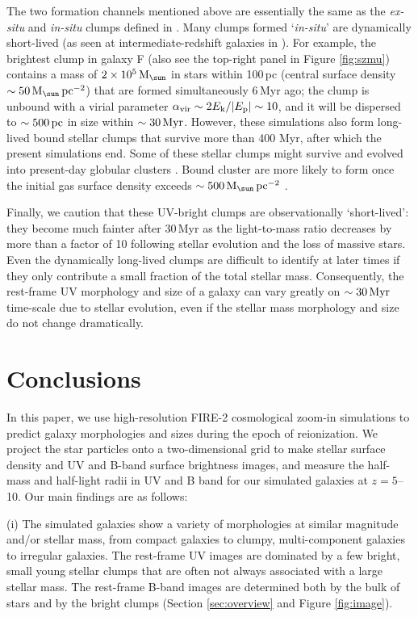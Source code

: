 \documentclass[useAMS,usenatbib]{mn2e}
\newcommand{\pc}{{\rm pc}}
\newcommand{\Myr}{{\rm Myr}}
\newcommand{\Msun}{{\rm M}_{\sun}}
\begin{document}
The two formation channels mentioned above are essentially the same as the {\em ex-situ} and {\em in-situ} clumps defined in \citet{mandelker.2017:giant.clumps}. Many clumps formed `{\em in-situ}' are dynamically short-lived (as seen at intermediate-redshift galaxies in \citealt{oklopcic.2017:fire.giant.clump}). For example, the brightest clump in galaxy F (also see the top-right panel in Figure \ref{fig:szmu}) contains a mass of $2\times10^5\,\Msun$ in stars within 100\,pc (central surface density $\sim50\,\Msun\,\pc^{-2}$) that are formed simultaneously 6\,Myr ago; the clump is unbound with a virial parameter $\alpha_{\rm vir}\sim2E_{\rm k}/|E_{\rm p}|\sim10$, and it will be dispersed to $\sim500\,\pc$ in size within $\sim30\,\Myr$. However, these simulations also form long-lived bound stellar clumps that survive more than 400 Myr, after which the present simulations end. Some of these stellar clumps might survive and evolved into present-day globular clusters \citep{kim.2018:globular.candidate.fire}. Bound cluster are more likely to form once the initial gas surface density exceeds $\sim500\,\Msun\,\pc^{-2}$ \citep[also see][]{grudic.2017:high.sf.efficiency}. 

Finally, we caution that these UV-bright clumps are observationally `short-lived': they become much fainter after 30\,Myr as the light-to-mass ratio decreases by more than a factor of 10 following stellar evolution and the loss of massive stars. Even the dynamically long-lived clumps are difficult to identify at later times if they only contribute a small fraction of the total stellar mass. Consequently, the rest-frame UV morphology and size of a galaxy can vary greatly on $\sim30\,\Myr$ time-scale due to stellar evolution, even if the stellar mass morphology and size do not change dramatically.


\section{Conclusions}
\label{sec:conclusion}
In this paper, we use high-resolution FIRE-2 cosmological zoom-in simulations to predict galaxy morphologies and sizes during the epoch of reionization. We project the star particles onto a two-dimensional grid to make stellar surface density and UV and B-band surface brightness images, and measure the half-mass and half-light radii in UV and B band for our simulated galaxies at $z=5$--10. Our main findings are as follows: 

(i) The simulated galaxies show a variety of morphologies at similar magnitude and/or stellar mass, from compact galaxies to clumpy, multi-component galaxies to irregular galaxies. The rest-frame UV images are dominated by a few bright, small young stellar clumps that are often not always associated with a large stellar mass. The rest-frame B-band images are determined both by the bulk of stars and by the bright clumps (Section \ref{sec:overview} and Figure \ref{fig:image}). 
\end{document}
